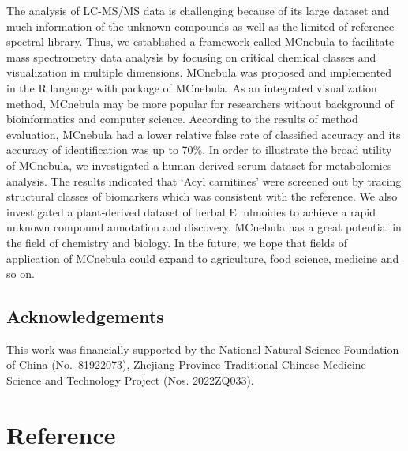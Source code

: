 \documentclass[
]{article}
\begin{document}
The analysis of LC-MS/MS data is challenging because of its large
dataset and much information of the unknown compounds as well as the
limited of reference spectral library. Thus, we established a framework
called MCnebula to facilitate mass spectrometry data analysis by
focusing on critical chemical classes and visualization in multiple
dimensions. MCnebula was proposed and implemented in the R language with
package of MCnebula. As an integrated visualization method, MCnebula may
be more popular for researchers without background of bioinformatics and
computer science. According to the results of method evaluation,
MCnebula had a lower relative false rate of classified accuracy and its
accuracy of identification was up to 70\%. In order to illustrate the
broad utility of MCnebula, we investigated a human-derived serum dataset
for metabolomics analysis. The results indicated that `Acyl carnitines'
were screened out by tracing structural classes of biomarkers which was
consistent with the reference. We also investigated a plant-derived
dataset of herbal E. ulmoides to achieve a rapid unknown compound
annotation and discovery. MCnebula has a great potential in the field of
chemistry and biology. In the future, we hope that fields of application
of MCnebula could expand to agriculture, food science, medicine and so
on.

\hypertarget{acknowledgements}{%
\subsection{Acknowledgements}\label{acknowledgements}}

This work was financially supported by the National Natural Science
Foundation of China (No.~81922073), Zhejiang Province Traditional
Chinese Medicine Science and Technology Project (Nos. 2022ZQ033).

\hypertarget{bibliography}{%
\section*{Reference}\label{bibliography}}
\end{document}
